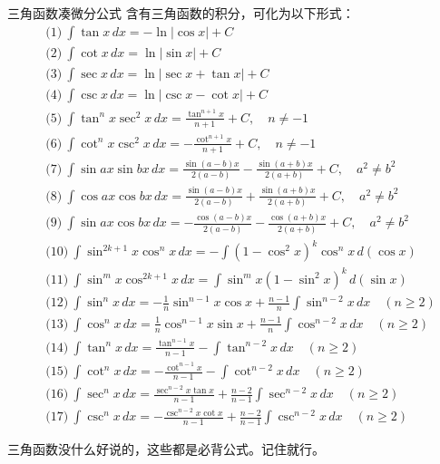 \begin{theorem}{三角函数凑微分公式}{}
  含有三角函数的积分，可化为以下形式：
  \[
\begin{aligned}
&\text{(1)}\ \int \tan x \,dx = -\ln|\cos x|+C \\[4pt]
&\text{(2)}\ \int \cot x \,dx = \ln|\sin x|+C \\[4pt]
&\text{(3)}\ \int \sec x \,dx = \ln|\sec x + \tan x|+C \\[4pt]
&\text{(4)}\ \int \csc x \,dx = \ln|\csc x - \cot x|+C \\[4pt]
&\text{(5)}\ \int \tan^n x \sec^2 x \,dx = \frac{\tan^{n+1}x}{n+1}+C, \quad n\neq -1 \\[4pt]
&\text{(6)}\ \int \cot^n x \csc^2 x \,dx = -\frac{\cot^{n+1}x}{n+1}+C, \quad n\neq -1 \\[4pt]
&\text{(7)}\ \int \sin ax \sin bx\,dx = \frac{\sin(a-b)x}{2(a-b)} - \frac{\sin(a+b)x}{2(a+b)} + C,\quad a^2\neq b^2 \\[4pt]
&\text{(8)}\ \int \cos ax \cos bx\,dx = \frac{\sin(a-b)x}{2(a-b)} + \frac{\sin(a+b)x}{2(a+b)} + C,\quad a^2\neq b^2 \\[4pt]
&\text{(9)}\ \int \sin ax \cos bx\,dx = -\frac{\cos(a-b)x}{2(a-b)} - \frac{\cos(a+b)x}{2(a+b)} + C,\quad a^2\neq b^2 \\[4pt]
&\text{(10)}\ \int \sin^{2k+1}x \cos^n x \,dx = -\int (1-\cos^2 x)^k \cos^n x \,d(\cos x) \\[4pt]
&\text{(11)}\ \int \sin^m x \cos^{2k+1}x \,dx = \int \sin^m x (1-\sin^2 x)^k \,d(\sin x) \\[4pt]
&\text{(12)}\ \int \sin^n x\,dx = -\frac{1}{n}\sin^{n-1}x\cos x + \frac{n-1}{n}\int \sin^{n-2}x\,dx \quad (n\ge 2) \\[4pt]
&\text{(13)}\ \int \cos^n x\,dx = \frac{1}{n}\cos^{n-1}x\sin x + \frac{n-1}{n}\int \cos^{n-2}x\,dx \quad (n\ge 2) \\[4pt]
&\text{(14)}\ \int \tan^n x\,dx = \frac{\tan^{n-1}x}{n-1} - \int \tan^{n-2}x\,dx \quad (n\ge 2) \\[4pt]
&\text{(15)}\ \int \cot^n x\,dx = -\frac{\cot^{n-1}x}{n-1} - \int \cot^{n-2}x\,dx \quad (n\ge 2) \\[4pt]
&\text{(16)}\ \int \sec^n x\,dx = \frac{\sec^{n-2}x\tan x}{n-1} + \frac{n-2}{n-1}\int \sec^{n-2}x\,dx \quad (n\ge 2) \\[4pt]
&\text{(17)}\ \int \csc^n x\,dx = -\frac{\csc^{n-2}x\cot x}{n-1} + \frac{n-2}{n-1}\int \csc^{n-2}x\,dx \quad (n\ge 2)
\end{aligned}
\]
\end{theorem}
三角函数没什么好说的，这些都是必背公式。记住就行。


